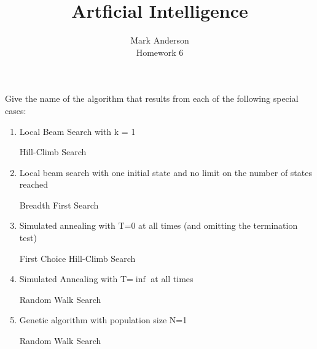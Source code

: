 \documentclass[12pt]{article}
\begin{document}
\title{Artficial Intelligence} 
\author{Mark Anderson\\ 
Homework 6} 
\maketitle
Give the name of the algorithm that results from each of the following special cases:
\begin{enumerate}
  \item Local Beam Search with k = 1 \par Hill-Climb Search
  \item Local beam search with one initial state and no limit on the number of states reached \par Breadth First Search
  \item Simulated annealing with T=0 at all times (and omitting the termination test) \par First Choice Hill-Climb Search
  \item Simulated Annealing with T=$\inf$ at all times \par Random Walk Search
  \item Genetic algorithm with population size N=1 \par Random Walk Search
\end{enumerate}
\end{document}
